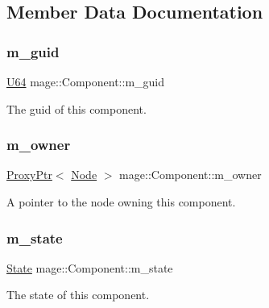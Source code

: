 \subsection{Member Data Documentation}
\mbox{\label{classmage_1_1_component_a3ddfe848bbd16a86dbdfd2717c0618da}} 
\subsubsection{\texorpdfstring{m\+\_\+guid}{m\_guid}}
{\footnotesize\ttfamily \mbox{\hyperlink{namespacemage_a6672cf3c861707ce4a3235a3eb43941d}{U64}} mage\+::\+Component\+::m\+\_\+guid\hspace{0.3cm}{\ttfamily [private]}}

The guid of this component. \mbox{\label{classmage_1_1_component_ad32770e1f30112cebd2894c1e976a4a7}} 
\subsubsection{\texorpdfstring{m\+\_\+owner}{m\_owner}}
{\footnotesize\ttfamily \mbox{\hyperlink{classmage_1_1_proxy_ptr}{Proxy\+Ptr}}$<$ \mbox{\hyperlink{classmage_1_1_node}{Node}} $>$ mage\+::\+Component\+::m\+\_\+owner\hspace{0.3cm}{\ttfamily [private]}}

A pointer to the node owning this component. \mbox{\label{classmage_1_1_component_a541a035d18f4d9f3873996716a8192d5}} 
\subsubsection{\texorpdfstring{m\+\_\+state}{m\_state}}
{\footnotesize\ttfamily \mbox{\hyperlink{namespacemage_ae47d13d8477ee94893b9a3947d28eebc}{State}} mage\+::\+Component\+::m\+\_\+state\hspace{0.3cm}{\ttfamily [private]}}

The state of this component. 